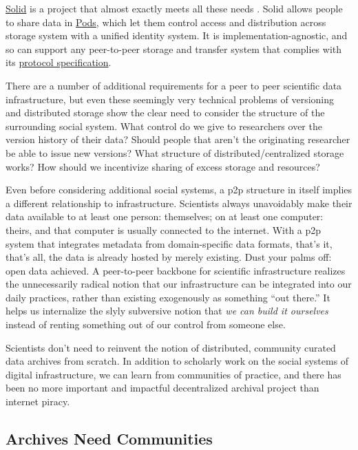 \href{https://solidproject.org/}{Solid} is a project that almost exactly
meets all these needs \citep{capadisliSolidProtocol2020, sambraSolidPlatformDecentralized2016, SolidP2PFoundation} . Solid
allows people to share data in
\href{https://solidproject.org/about}{Pods}, which let them control
access and distribution across storage system with a unified identity
system. It is implementation-agnostic, and so can support any
peer-to-peer storage and transfer system that complies with its
\href{https://solidproject.org/TR/protocol}{protocol specification}.

There are a number of additional requirements for a peer to peer
scientific data infrastructure, but even these seemingly very technical
problems of versioning and distributed storage show the clear need to
consider the structure of the surrounding social system. What control do
we give to researchers over the version history of their data? Should
people that aren't the originating researcher be able to issue new
versions? What structure of distributed/centralized storage works? How
should we incentivize sharing of excess storage and resources?

Even before considering additional social systems, a p2p structure in
itself implies a different relationship to infrastructure. Scientists
always unavoidably make their data available to at least one person:
themselves; on at least one computer: theirs, and that computer is
usually connected to the internet. With a p2p system that integrates
metadata from domain-specific data formats, that's it, that's all, the
data is already hosted by merely existing. Dust your palms off: open
data achieved. A peer-to-peer backbone for scientific infrastructure
realizes the unnecessarily radical notion that our infrastructure can be
integrated into our daily practices, rather than existing exogenously as
something ``out there.'' It helps us internalize the slyly subversive
notion that \emph{we can build it ourselves} instead of renting
something out of our control from someone else.

Scientists don't need to reinvent the notion of distributed, community
curated data archives from scratch. In addition to scholarly work on the
social systems of digital infrastructure, we can learn from communities
of practice, and there has been no more important and impactful
decentralized archival project than internet piracy.

\hypertarget{archives-need-communities}{%
\subsection{Archives Need Communities}\label{archives-need-communities}}


